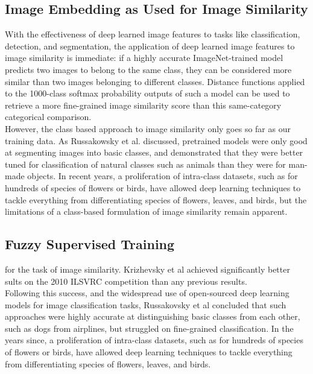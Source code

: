 \documentclass[pageno]{jpaper}
\begin{document}
\subsection{Image Embedding as Used for Image Similarity}

With the effectiveness of deep learned image features to tasks like classification, detection, and segmentation, the application of deep learned image features to image similarity is immediate: if a highly accurate ImageNet-trained model predicts two images to belong to the same class, they can be considered more similar than two images belonging to different classes. Distance functions applied to the 1000-class softmax probability outputs of such a model can be used to retrieve a more fine-grained image similarity score than this same-category categorical comparison.\\

However, the class based approach to image similarity only goes so far as our training data. As Russakowsky et al. discussed\cite{russakovsky2013detecting}, pretrained models were only good at segmenting images into basic classes, and demonstrated that they were better tuned for classification of natural classes such as animals than they were for man-made objects. In recent years, a proliferation of intra-class datasets, such as for hundreds of species of flowers or birds, have allowed deep learning techniques to tackle everything from differentiating species of flowers\cite{angelova2013image}, leaves\cite{rejeb2013vantage}, and birds\cite{berg2014birdsnap}, but the limitations of a class-based formulation of image similarity remain apparent. 




\subsection{Fuzzy Supervised Training}

for the task of image similarity. Krizhevsky et al achieved significantly better sults on the 2010 ILSVRC competition than any previous results.\\


Following this success, and the widespread use of open-sourced deep learning models for image classification tasks, Russakovsky et al concluded that such approaches were highly accurate at distinguishing basic classes from each other, such as dogs from airplines, but struggled on fine-grained classification.\cite{russakovsky2013detecting} In the years since, a proliferation of intra-class datasets, such as for hundreds of species of flowers or birds, have allowed deep learning techniques to tackle everything from differentiating species of flowers\cite{angelova2013image}, leaves\cite{rejeb2013vantage}, and birds\cite{berg2014birdsnap}.\\
\end{document}
